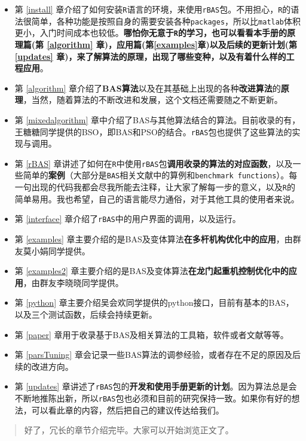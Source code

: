 \documentclass[]{ctexbook}
\begin{document}
\begin{itemize}
\item
  第 \ref{install}
  章介绍了如何安装\texttt{R}语言的环境，来使用\texttt{rBAS}包。不用担心，\texttt{R}的语法很简单，各种功能是按照自身的需要安装各种\texttt{packages}，所以比\texttt{matlab}体积更小，入门时间成本也较低。\textbf{哪怕你无意于\texttt{R}的学习，也可以看看本手册的原理篇(第
  \ref{algorithm} 章)，应用篇(第\ref{examples}章)以及后续的更新计划(第
  \ref{updates}
  章)，来了解算法的原理，出现了哪些变种，以及有着什么样的工程应用}。
\item
  第 \ref{algorithm}
  章介绍了\textbf{BAS算法}以及在其基础上出现的各种\textbf{改进算法}的\textbf{原理}，当然，随着算法的不断改进和发展，这个文档还需要随之不断更新。
\item
  第 \ref{mixedalgorithm}
  章中介绍了BAS与其他算法结合的算法。目前收录的有，王糖糖同学提供的BSO，即BAS和PSO的结合。\texttt{rBAS}包也提供了这些算法的实现与调用。
\item
  第 \ref{rBAS}
  章讲述了如何在\texttt{R}中使用\texttt{rBAS}包\textbf{调用收录的算法的对应函数}，以及一些简单的\textbf{案例}（大部分是\texttt{BAS}相关文献中的算例和\texttt{benchmark\ functions}）。每一句出现的代码我都会尽我所能去注释，让大家了解每一步的意义，以及\texttt{R}的简单易用。我也希望，自己的语言能尽力通俗，对于其他工具的使用者来说。
\item
  第 \ref{interface} 章介绍了\texttt{rBAS}中的用户界面的调用，以及运行。
\item
  第 \ref{examples}
  章主要介绍的是BAS及变体算法\textbf{在多杆机构优化中的应用}，由群友莫小娟同学提供。
\item
  第 \ref{examples2}
  章主要介绍的是BAS及变体算法\textbf{在龙门起重机控制优化中的应用}，由群友李晓晓同学提供。
\item
  第 \ref{python}
  章主要介绍吴会欢同学提供的python接口，目前有基本的BAS，以及三个测试函数，后续会持续更新。
\item
  第 \ref{paper} 章用于收录基于BAS及相关算法的工具箱，软件或者文献等等。
\item
  第 \ref{parsTuning}
  章会记录一些BAS算法的调参经验，或者存在不足的原因及后续的改进方向。
\item
  第 \ref{updates}
  章讲述了\texttt{rBAS}包的\textbf{开发和使用手册更新的计划}。因为算法总是会不断地推陈出新，所以\texttt{rBAS}包也必须和目前的研究保持一致。如果你有好的想法，可以看此章的内容，然后把自己的建议传达给我们。
\end{itemize}

\begin{quote}
好了，冗长的章节介绍完毕。大家可以开始浏览正文了。
\end{quote}
\end{document}
